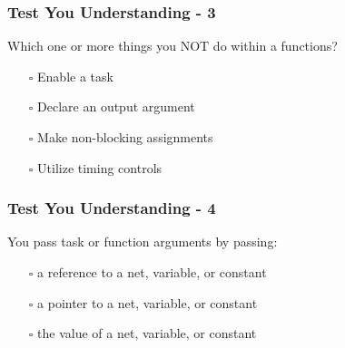 \documentclass[t, notes, xcolor=table]{beamer}
\begin{document}
\begin{frame}
\frametitle{Test You Understanding - 3}
Which one or more things you NOT do within a functions?
\begin{itemize}
\item[$\square$] Enable a task
\item[$\square$] Declare an output argument
\item[$\square$] Make non-blocking assignments
\item[$\square$] Utilize timing controls
\end{itemize}
\end{frame}

\begin{frame}
\frametitle{Test You Understanding - 4}
You pass task or function arguments by passing:
\begin{itemize}
\item[$\square$] a reference to a net, variable, or constant
\item[$\square$] a pointer to a net, variable, or constant
\item[$\square$] the value of a net, variable, or constant
\end{itemize}
\end{frame}
\end{document}
